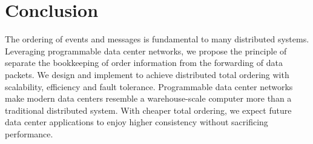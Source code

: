 \section{Conclusion}
\label{sec:conclusion}

The ordering of events and messages is fundamental to many distributed systems.
Leveraging programmable data center networks, we propose the principle of separate the bookkeeping of order information from the forwarding of data packets.
We design and implement \sys to achieve distributed total ordering with scalability, efficiency and fault tolerance.
Programmable data center networks make modern data centers resemble a warehouse-scale computer more than a traditional distributed system.
With cheaper total ordering, we expect future data center applications to enjoy higher consistency without sacrificing performance.